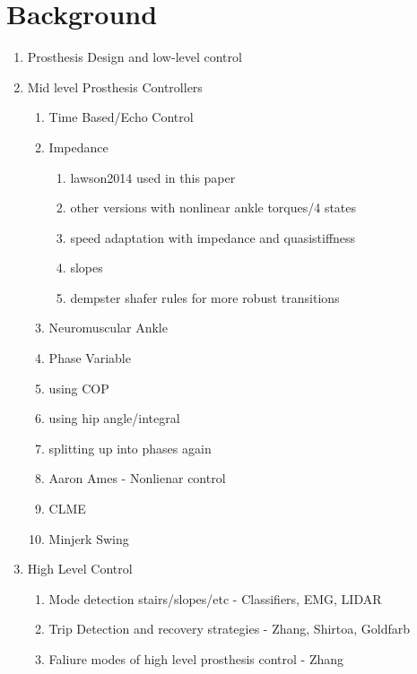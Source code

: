 \section{Background}\label{sec:intro_background} 

\begin{enumerate}
\item Prosthesis Design and low-level control
\item Mid level Prosthesis Controllers
    \begin{enumerate}
        \item Time Based/Echo Control
        \item Impedance 
            \begin{enumerate}
                \item lawson2014 used in this paper
                \item other versions with nonlinear ankle torques/4 states
                \item speed adaptation with impedance and quasistiffness
                \item slopes
                \item dempster shafer rules for more robust transitions
            \end{enumerate}
        \item Neuromuscular Ankle
        \item Phase Variable
            \item using COP
            \item using hip angle/integral
            \item splitting up into phases again
        \item Aaron Ames - Nonlienar control 
        \item CLME
        \item Minjerk Swing
    \end{enumerate}
\item High Level Control
    \begin{enumerate}
        \item Mode detection stairs/slopes/etc - Classifiers, EMG, LIDAR
        \item Trip Detection and recovery strategies - Zhang, Shirtoa, Goldfarb
        \item Faliure modes of high level prosthesis control - Zhang
    \end{enumerate}
\end{enumerate}
